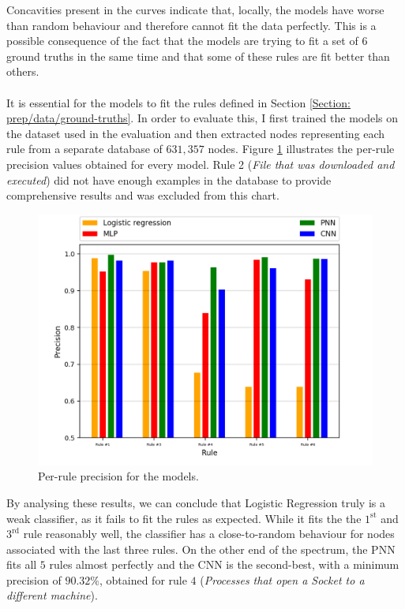		Concavities present in the curves indicate that, locally, the models have worse than random behaviour and therefore cannot fit the data perfectly. This is a possible consequence of the fact that the models are trying to fit a set of $6$ ground truths in the same time and that some of these rules are fit better than others. 
		\\ \\
		It is essential for the models to fit the rules defined in Section \ref{Section: prep/data/ground-truths}. In order to evaluate this, I first trained the models on the dataset used in the evaluation and then extracted nodes representing each rule from a separate database of $631, 357$ nodes. Figure \ref{Figure: eval/ml/results/per-rule} illustrates the per-rule precision values obtained for every model. Rule 2 (\textit{File that was downloaded and executed}) did not have enough examples in the database to provide comprehensive results and was excluded from this chart. 
		\begin{figure}[H]
			\centering
			\includegraphics[width=.8\textwidth]{graphics/per-rule-precision}
			\caption{Per-rule precision for the models.}
			\label{Figure: eval/ml/results/per-rule}
		\end{figure}
		By analysing these results, we can conclude that Logistic Regression truly is a weak classifier, as it fails to fit the rules as expected. While it fits the the $1^{\text{st}}$ and $3^{\text{rd}}$ rule reasonably well, the classifier has a close-to-random behaviour for nodes associated with the last three rules. On the other end of the spectrum, the PNN fits all $5$ rules almost perfectly and the CNN is the second-best, with a minimum precision of $90.32 \%$, obtained for rule $4$ (\textit{Processes that open a Socket to a different machine}).  
		\\ \\
